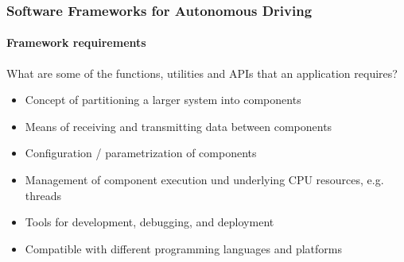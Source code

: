 \begin{frame}
\frametitle{Software Frameworks for Autonomous Driving}
\framesubtitle{Framework requirements}
What are some of the functions, utilities and APIs that an application requires?
\vspace{0.25cm}
\begin{itemize}
    \item Concept of partitioning a larger system into components
    \item Means of receiving and transmitting data between components
    \item Configuration / parametrization of components
    \item Management of component execution und underlying CPU resources,
        e.g. threads
    \item Tools for development, debugging, and deployment
    \item Compatible with different programming languages and platforms
\end{itemize}
\end{frame}

